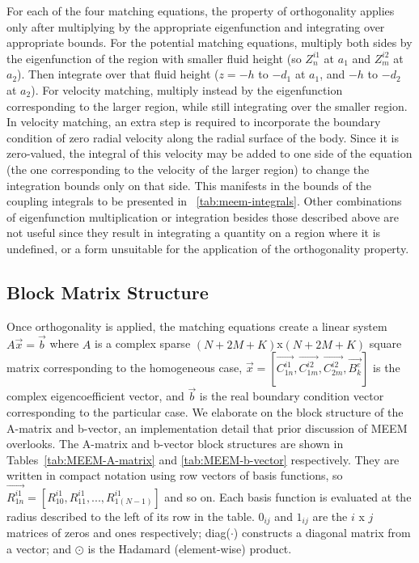 \begin{appendices}
For each of the four matching equations, the property of orthogonality applies only after multiplying by the appropriate eigenfunction and integrating over appropriate bounds.
For the potential matching equations, multiply both sides by the eigenfunction of the region with smaller fluid height (so $Z_n^{i1}$ at $a_1$ and $Z_m^{i2}$ at $a_2$).
Then integrate over that fluid height ($z=-h$ to $-d_1$ at $a_1$, and $-h$ to $-d_2$ at $a_2$).
For velocity matching, multiply instead by the eigenfunction corresponding to the larger region, while still integrating over the smaller region.
In velocity matching, an extra step is required to incorporate the boundary condition of zero radial velocity along the radial surface of the body.
Since it is zero-valued, the integral of this velocity may be added to one side of the equation (the one corresponding to the velocity of the larger region) to change the integration bounds only on that side.
This manifests in the bounds of the coupling integrals to be presented in \tableautorefname~\ref{tab:meem-integrals}.
Other combinations of eigenfunction multiplication or integration besides those described above are not useful since they result in integrating a quantity on a region where it is undefined, or a form unsuitable for the application of the orthogonality property.

\subsection{Block Matrix Structure}

Once orthogonality is applied, the matching equations create a linear system $A\vec{x}=\vec{b}$ where $A$ is a complex sparse $(N+2M+K)$x$(N+2M+K)$ square matrix corresponding to the homogeneous case, $\vec{x}=[\vec{C_{1n}^{i1}}, \vec{C_{1m}^{i2}}, \vec{C_{2m}^{i2}}, \vec{B_{k}^{e}}]$ is the complex eigencoefficient vector, and $\vec{b}$ is the real boundary condition vector corresponding to the particular case.
We elaborate on the block structure of the A-matrix and b-vector, an implementation detail that prior discussion of MEEM overlooks.
The A-matrix and b-vector block structures are shown in Tables~\ref{tab:MEEM-A-matrix} and \ref{tab:MEEM-b-vector} respectively.
They are written in compact notation using row vectors of basis functions, so $\vec{R_{1n}^{i1}}=[R_{10}^{i1}, R_{11}^{i1}, ..., R_{1(N-1)}^{i1}]$ and so on.
Each basis function is evaluated at the radius described to the left of its row in the table. $0_{ij}$ and $1_{ij}$ are the $i$ x $j$ matrices of zeros and ones respectively; diag($\cdot$) constructs a diagonal matrix from a vector; and $\odot$ is the Hadamard (element-wise) product.


\end{appendices}
